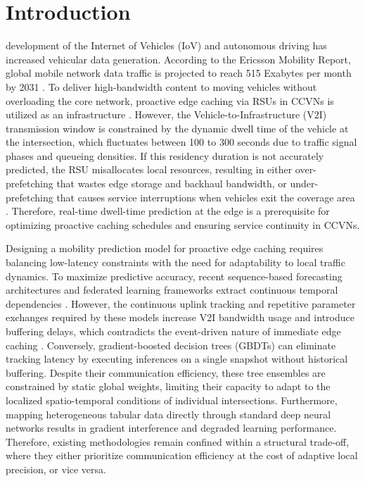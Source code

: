 \documentclass[journal]{IEEEtran}
\begin{document}
\section{Introduction} \label{sec:introduction}
 development of the Internet of Vehicles (IoV) and autonomous driving has increased vehicular data generation. According to the Ericsson Mobility Report, global mobile network data traffic is projected to reach 515 Exabytes per month by 2031 \cite{ericsson2023}. To deliver high-bandwidth content to moving vehicles without overloading the core network, proactive edge caching via RSUs in CCVNs is utilized as an infrastructure \cite{wang2017, nam2025, su2018}. However, the Vehicle-to-Infrastructure (V2I) transmission window is constrained by the dynamic dwell time of the vehicle at the intersection, which fluctuates between 100 to 300 seconds due to traffic signal phases and queueing densities. If this residency duration is not accurately predicted, the RSU misallocates local resources, resulting in either over-prefetching that wastes edge storage and backhaul bandwidth, or under-prefetching that causes service interruptions when vehicles exit the coverage area \cite{huang2019, feng2023, wang2025}. Therefore, real-time dwell-time prediction at the edge is a prerequisite for optimizing proactive caching schedules and ensuring service continuity in CCVNs.

\IEEEpubidadjcol
Designing a mobility prediction model for proactive edge caching requires balancing low-latency constraints with the need for adaptability to local traffic dynamics. To maximize predictive accuracy, recent sequence-based forecasting architectures and federated learning frameworks extract continuous temporal dependencies \cite{cheng2025, jiang2024}. However, the continuous uplink tracking and repetitive parameter exchanges required by these models increase V2I bandwidth usage and introduce buffering delays, which contradicts the event-driven nature of immediate edge caching \cite{yu2024, aung2023}. Conversely, gradient-boosted decision trees (GBDTs) can eliminate tracking latency by executing inferences on a single snapshot without historical buffering. Despite their communication efficiency, these tree ensembles are constrained by static global weights, limiting their capacity to adapt to the localized spatio-temporal conditions of individual intersections. Furthermore, mapping heterogeneous tabular data directly through standard deep neural networks results in gradient interference and degraded learning performance. Therefore, existing methodologies remain confined within a structural trade-off, where they either prioritize communication efficiency at the cost of adaptive local precision, or vice versa.
\end{document}
